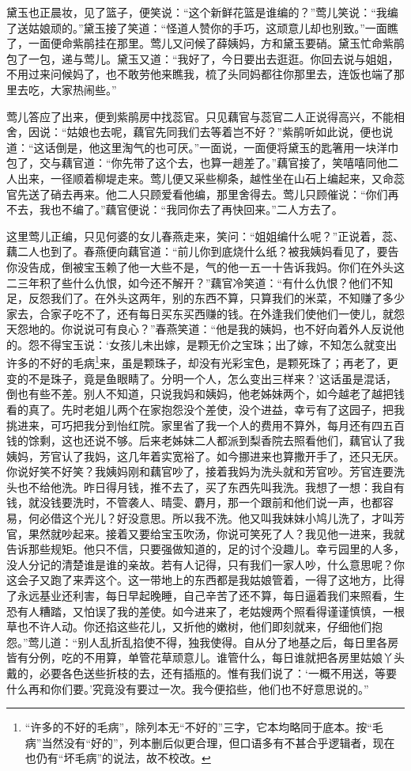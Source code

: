 黛玉也正晨妆，见了篮子，便笑说：“这个新鲜花篮是谁编的？”莺儿笑说：“我编了送姑娘顽的。”黛玉接了笑道：“怪道人赞你的手巧，这顽意儿却也别致。”一面瞧了，一面便命紫鹃挂在那里。莺儿又问候了薛姨妈，方和黛玉要硝。黛玉忙命紫鹃包了一包，递与莺儿。黛玉又道：“我好了，今日要出去逛逛。你回去说与姐姐，不用过来问候妈了，也不敢劳他来瞧我，梳了头同妈都往你那里去，连饭也端了那里去吃，大家热闹些。”

莺儿答应了出来，便到紫鹃房中找蕊官。只见藕官与蕊官二人正说得高兴，不能相舍，因说：“姑娘也去呢，藕官先同我们去等着岂不好？”紫鹃听如此说，便也说道：“这话倒是，他这里淘气的也可厌。”一面说，一面便将黛玉的匙箸用一块洋巾包了，交与藕官道：“你先带了这个去，也算一趟差了。”藕官接了，笑嘻嘻同他二人出来，一径顺着柳堤走来。莺儿便又采些柳条，越性坐在山石上编起来，又命蕊官先送了硝去再来。他二人只顾爱看他编，那里舍得去。莺儿只顾催说：“你们再不去，我也不编了。”藕官便说：“我同你去了再快回来。”二人方去了。

这里莺儿正编，只见何婆的女儿春燕走来，笑问：“姐姐编什么呢？”正说着，蕊、藕二人也到了。春燕便向藕官道：“前儿你到底烧什么纸？被我姨妈看见了，要告你没告成，倒被宝玉赖了他一大些不是，气的他一五一十告诉我妈。你们在外头这二三年积了些什么仇恨，如今还不解开？”藕官冷笑道：“有什么仇恨？他们不知足，反怨我们了。在外头这两年，别的东西不算，只算我们的米菜，不知赚了多少家去，合家子吃不了，还有每日买东买西赚的钱。在外逢我们使他们一使儿，就怨天怨地的。你说说可有良心？”春燕笑道：“他是我的姨妈，也不好向着外人反说他的。怨不得宝玉说：‘女孩儿未出嫁，是颗无价之宝珠；出了嫁，不知怎么就变出许多的不好的毛病\footnote{“许多的不好的毛病”，除列本无“不好的”三字，它本均略同于底本。按“毛病”当然没有“好的”，列本删后似更合理，但口语多有不甚合乎逻辑者，现在也仍有“坏毛病”的说法，故不校改。}来，虽是颗珠子，却没有光彩宝色，是颗死珠了；再老了，更变的不是珠子，竟是鱼眼睛了。分明一个人，怎么变出三样来？’这话虽是混话，倒也有些不差。别人不知道，只说我妈和姨妈，他老姊妹两个，如今越老了越把钱看的真了。先时老姐儿两个在家抱怨没个差使，没个进益，幸亏有了这园子，把我挑进来，可巧把我分到怡红院。家里省了我一个人的费用不算外，每月还有四五百钱的馀剩，这也还说不够。后来老姊妹二人都派到梨香院去照看他们，藕官认了我姨妈，芳官认了我妈，这几年着实宽裕了。如今挪进来也算撒开手了，还只无厌。你说好笑不好笑？我姨妈刚和藕官吵了，接着我妈为洗头就和芳官吵。芳官连要洗头也不给他洗。昨日得月钱，推不去了，买了东西先叫我洗。我想了一想：我自有钱，就没钱要洗时，不管袭人、晴雯、麝月，那一个跟前和他们说一声，也都容易，何必借这个光儿？好没意思。所以我不洗。他又叫我妹妹小鸠儿洗了，才叫芳官，果然就吵起来。接着又要给宝玉吹汤，你说可笑死了人？我见他一进来，我就告诉那些规矩。他只不信，只要强做知道的，足的讨个没趣儿。幸亏园里的人多，没人分记的清楚谁是谁的亲故。若有人记得，只有我们一家人吵，什么意思呢？你这会子又跑了来弄这个。这一带地上的东西都是我姑娘管着，一得了这地方，比得了永远基业还利害，每日早起晚睡，自己辛苦了还不算，每日逼着我们来照看，生恐有人糟踏，又怕误了我的差使。如今进来了，老姑嫂两个照看得谨谨慎慎，一根草也不许人动。你还掐这些花儿，又折他的嫩树，他们即刻就来，仔细他们抱怨。”莺儿道：“别人乱折乱掐使不得，独我使得。自从分了地基之后，每日里各房皆有分例，吃的不用算，单管花草顽意儿。谁管什么，每日谁就把各房里姑娘丫头戴的，必要各色送些折枝的去，还有插瓶的。惟有我们说了：‘一概不用送，等要什么再和你们要。’究竟没有要过一次。我今便掐些，他们也不好意思说的。”

